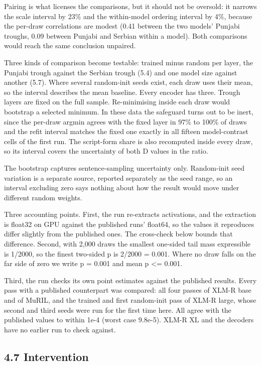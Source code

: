 Pairing is what licenses the comparisons, but it should not be oversold:
it narrows the scale interval by 23\% and the within-model ordering
interval by 4\%, because the per-draw correlations are modest (0.41
between the two models' Punjabi troughs, 0.09 between Punjabi and
Serbian within a model). Both comparisons would reach the same
conclusion unpaired.

Three kinds of comparison become testable: trained minus random per
layer, the Punjabi trough against the Serbian trough (5.4) and one model
size against another (5.7). Where several random-init seeds exist, each
draw uses their mean, so the interval describes the mean baseline. Every
encoder has three. Trough layers are fixed on the full sample.
Re-minimising inside each draw would bootstrap a selected minimum. In
these data the safeguard turns out to be inert, since the per-draw
argmin agrees with the fixed layer in 97\% to 100\% of draws and the
refit interval matches the fixed one exactly in all fifteen
model-contrast cells of the first run. The script-form share is also
recomputed inside every draw, so its interval covers the uncertainty of
both D values in the ratio.

The bootstrap captures sentence-sampling uncertainty only. Random-init
seed variation is a separate source, reported separately as the seed
range, so an interval excluding zero says nothing about how the result
would move under different random weights.

Three accounting points. First, the run re-extracts activations, and the
extraction is float32 on GPU against the published runs' float64, so the
values it reproduces differ slightly from the published ones. The
cross-check below bounds that difference. Second, with 2,000 draws the
smallest one-sided tail mass expressible is 1/2000, so the finest
two-sided p is 2/2000 = 0.001. Where no draw falls on the far side of
zero we write p = 0.001 and mean p \textless= 0.001.

Third, the run checks its own point estimates against the published
results. Every pass with a published counterpart was compared: all four
passes of XLM-R base and of MuRIL, and the trained and first random-init
pass of XLM-R large, whose second and third seeds were run for the first
time here. All agree with the published values to within 1e-4 (worst
case 9.8e-5). XLM-R XL and the decoders have no earlier run to check
against.

\hypertarget{intervention}{%
\subsection{4.7 Intervention}\label{intervention}}

